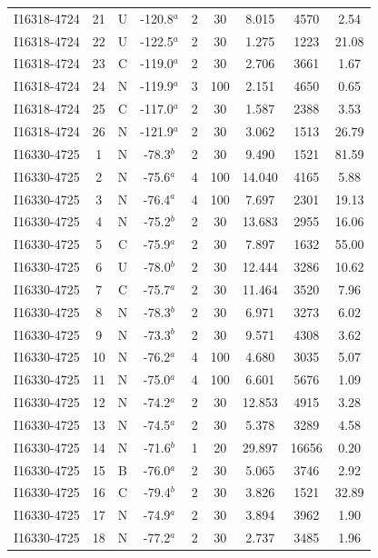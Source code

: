\begin{table}
\begin{tabular}{ccccccccc}
I16318-4724 & 21 & U & -120.8$^{a}$ & 2 & 30 & 8.015 & 4570 & 2.54 \\
I16318-4724 & 22 & U & -122.5$^{a}$ & 2 & 30 & 1.275 & 1223 & 21.08 \\
I16318-4724 & 23 & C & -119.0$^{a}$ & 2 & 30 & 2.706 & 3661 & 1.67 \\
I16318-4724 & 24 & N & -119.9$^{a}$ & 3 & 100 & 2.151 & 4650 & 0.65 \\
I16318-4724 & 25 & C & -117.0$^{a}$ & 2 & 30 & 1.587 & 2388 & 3.53 \\
I16318-4724 & 26 & N & -121.9$^{a}$ & 2 & 30 & 3.062 & 1513 & 26.79 \\
I16330-4725 & 1 & N & -78.3$^{b}$ & 2 & 30 & 9.490 & 1521 & 81.59 \\
I16330-4725 & 2 & N & -75.6$^{a}$ & 4 & 100 & 14.040 & 4165 & 5.88 \\
I16330-4725 & 3 & N & -76.4$^{a}$ & 4 & 100 & 7.697 & 2301 & 19.13 \\
I16330-4725 & 4 & N & -75.2$^{b}$ & 2 & 30 & 13.683 & 2955 & 16.06 \\
I16330-4725 & 5 & C & -75.9$^{a}$ & 2 & 30 & 7.897 & 1632 & 55.00 \\
I16330-4725 & 6 & U & -78.0$^{b}$ & 2 & 30 & 12.444 & 3286 & 10.62 \\
I16330-4725 & 7 & C & -75.7$^{a}$ & 2 & 30 & 11.464 & 3520 & 7.96 \\
I16330-4725 & 8 & N & -78.3$^{b}$ & 2 & 30 & 6.971 & 3273 & 6.02 \\
I16330-4725 & 9 & N & -73.3$^{b}$ & 2 & 30 & 9.571 & 4308 & 3.62 \\
I16330-4725 & 10 & N & -76.2$^{a}$ & 4 & 100 & 4.680 & 3035 & 5.07 \\
I16330-4725 & 11 & N & -75.0$^{a}$ & 4 & 100 & 6.601 & 5676 & 1.09 \\
I16330-4725 & 12 & N & -74.2$^{a}$ & 2 & 30 & 12.853 & 4915 & 3.28 \\
I16330-4725 & 13 & N & -74.5$^{a}$ & 2 & 30 & 5.378 & 3289 & 4.58 \\
I16330-4725 & 14 & N & -71.6$^{b}$ & 1 & 20 & 29.897 & 16656 & 0.20 \\
I16330-4725 & 15 & B & -76.0$^{a}$ & 2 & 30 & 5.065 & 3746 & 2.92 \\
I16330-4725 & 16 & C & -79.4$^{b}$ & 2 & 30 & 3.826 & 1521 & 32.89 \\
I16330-4725 & 17 & N & -74.9$^{a}$ & 2 & 30 & 3.894 & 3962 & 1.90 \\
I16330-4725 & 18 & N & -77.2$^{a}$ & 2 & 30 & 2.737 & 3485 & 1.96 \\

\end{tabular}
\end{table}
